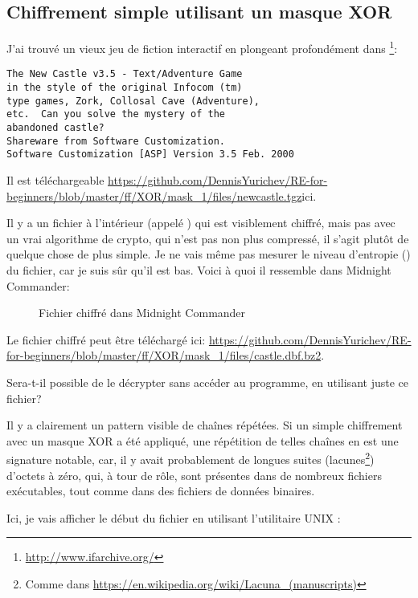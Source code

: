 \subsection{Chiffrement simple utilisant un masque XOR}
\label{XOR_mask_1}

J'ai trouvé un vieux jeu de fiction interactif en plongeant profondément dans \footnote{\url{http://www.ifarchive.org/}}:

\begin{lstlisting}
The New Castle v3.5 - Text/Adventure Game
in the style of the original Infocom (tm)
type games, Zork, Collosal Cave (Adventure),
etc.  Can you solve the mystery of the
abandoned castle?
Shareware from Software Customization.
Software Customization [ASP] Version 3.5 Feb. 2000
\end{lstlisting}

Il est téléchargeable
\url{https://github.com/DennisYurichev/RE-for-beginners/blob/master/ff/XOR/mask_1/files/newcastle.tgz}{ici}.

Il y a un fichier à l'intérieur (appelé ) qui est visiblement chiffré,
mais pas avec un vrai algorithme de crypto, qui n'est pas non plus compressé, il
s'agit plutôt de quelque chose de plus simple.
Je ne vais même pas mesurer le niveau d'entropie () du fichier, car
je suis sûr qu'il est bas.
Voici à quoi il ressemble dans Midnight Commander:

\begin{figure}[H]
\centering
{}
\caption{Fichier chiffré dans Midnight Commander}
\end{figure}

Le fichier chiffré peut être téléchargé ici:
\url{https://github.com/DennisYurichev/RE-for-beginners/blob/master/ff/XOR/mask_1/files/castle.dbf.bz2}.

Sera-t-il possible de le décrypter sans accéder au programme, en utilisant juste ce
fichier?

Il y a clairement un pattern visible de chaînes répétées.
Si un simple chiffrement avec un masque XOR a été appliqué, une répétition de telles
chaînes en est une signature notable, car, il y avait probablement de longues
suites (lacunes\footnote{Comme dans \url{https://en.wikipedia.org/wiki/Lacuna_(manuscripts)}})
d'octets à zéro, qui, à tour de rôle, sont présentes dans de nombreux
fichiers exécutables, tout comme dans des fichiers de données binaires.

Ici, je vais afficher le début du fichier en utilisant l'utilitaire UNIX :

